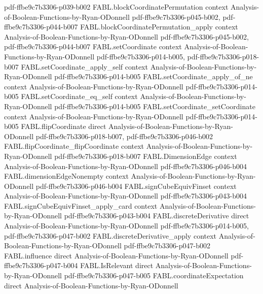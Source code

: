 \begin{theorem}
{    pdf-ffbe9c7b3306-p039-b002}
\proofstep
  {FABL.blockCoordinatePermutation}
  {context}
  {Analysis-of-Boolean-Functions-by-Ryan-ODonnell}
  {pdf-ffbe9c7b3306-p045-b002,
    pdf-ffbe9c7b3306-p044-b007}
\proofstep
  {FABL.blockCoordinatePermutation_apply}
  {context}
  {Analysis-of-Boolean-Functions-by-Ryan-ODonnell}
  {pdf-ffbe9c7b3306-p045-b002,
    pdf-ffbe9c7b3306-p044-b007}
\proofstep
  {FABL.setCoordinate}
  {context}
  {Analysis-of-Boolean-Functions-by-Ryan-ODonnell}
  {pdf-ffbe9c7b3306-p014-b005,
    pdf-ffbe9c7b3306-p018-b007}
\proofstep
  {FABL.setCoordinate_apply_self}
  {context}
  {Analysis-of-Boolean-Functions-by-Ryan-ODonnell}
  {pdf-ffbe9c7b3306-p014-b005}
\proofstep
  {FABL.setCoordinate_apply_of_ne}
  {context}
  {Analysis-of-Boolean-Functions-by-Ryan-ODonnell}
  {pdf-ffbe9c7b3306-p014-b005}
\proofstep
  {FABL.setCoordinate_eq_self}
  {context}
  {Analysis-of-Boolean-Functions-by-Ryan-ODonnell}
  {pdf-ffbe9c7b3306-p014-b005}
\proofstep
  {FABL.setCoordinate_setCoordinate}
  {context}
  {Analysis-of-Boolean-Functions-by-Ryan-ODonnell}
  {pdf-ffbe9c7b3306-p014-b005}
\proofstep
  {FABL.flipCoordinate}
  {direct}
  {Analysis-of-Boolean-Functions-by-Ryan-ODonnell}
  {pdf-ffbe9c7b3306-p018-b007,
    pdf-ffbe9c7b3306-p046-b002}
\proofstep
  {FABL.flipCoordinate_flipCoordinate}
  {context}
  {Analysis-of-Boolean-Functions-by-Ryan-ODonnell}
  {pdf-ffbe9c7b3306-p018-b007}
\proofstep
  {FABL.DimensionEdge}
  {context}
  {Analysis-of-Boolean-Functions-by-Ryan-ODonnell}
  {pdf-ffbe9c7b3306-p046-b004}
\proofstep
  {FABL.dimensionEdgeNonempty}
  {context}
  {Analysis-of-Boolean-Functions-by-Ryan-ODonnell}
  {pdf-ffbe9c7b3306-p046-b004}
\proofstep
  {FABL.signCubeEquivFinset}
  {context}
  {Analysis-of-Boolean-Functions-by-Ryan-ODonnell}
  {pdf-ffbe9c7b3306-p043-b004}
\proofstep
  {FABL.signCubeEquivFinset_apply_card}
  {context}
  {Analysis-of-Boolean-Functions-by-Ryan-ODonnell}
  {pdf-ffbe9c7b3306-p043-b004}
\proofstep
  {FABL.discreteDerivative}
  {direct}
  {Analysis-of-Boolean-Functions-by-Ryan-ODonnell}
  {pdf-ffbe9c7b3306-p014-b005,
    pdf-ffbe9c7b3306-p047-b002}
\proofstep
  {FABL.discreteDerivative_apply}
  {context}
  {Analysis-of-Boolean-Functions-by-Ryan-ODonnell}
  {pdf-ffbe9c7b3306-p047-b002}
\proofstep
  {FABL.influence}
  {direct}
  {Analysis-of-Boolean-Functions-by-Ryan-ODonnell}
  {pdf-ffbe9c7b3306-p047-b004}
\proofstep
  {FABL.IsRelevant}
  {direct}
  {Analysis-of-Boolean-Functions-by-Ryan-ODonnell}
  {pdf-ffbe9c7b3306-p047-b005}
\proofstep
  {FABL.coordinateExpectation}
  {direct}
  {Analysis-of-Boolean-Functions-by-Ryan-ODonnell}

\end{theorem}
